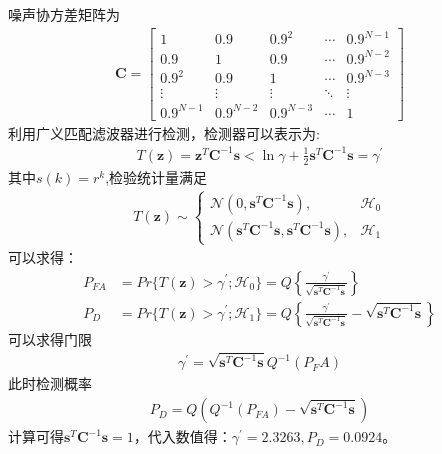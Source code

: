 \documentclass[fontset=windows]{article}
\numberwithin{figure}{section}
\begin{document}
噪声协方差矩阵为
\begin{align*}
    \mathbf{C}=
    \begin{bmatrix}
        1         & 0.9       & 0.9^2     & \cdots & 0.9^{N-1} \\
        0.9       & 1         & 0.9       & \cdots & 0.9^{N-2} \\
        0.9^2     & 0.9       & 1         & \cdots & 0.9^{N-3} \\
        \vdots    & \vdots    & \vdots    & \ddots & \vdots    \\
        0.9^{N-1} & 0.9^{N-2} & 0.9^{N-3} & \cdots & 1
    \end{bmatrix}
\end{align*}
利用广义匹配滤波器进行检测，检测器可以表示为:
\begin{align*}
    T(\mathbf{z})=\mathbf{z}^T\mathbf{C}^{-1}\mathbf{s}<\ln \gamma+\frac{1}{2}\mathbf{s}^T\mathbf{C}^{-1}\mathbf{s}=\gamma^{\prime}
\end{align*}
其中\(s(k)=r^k\),检验统计量满足
\begin{align*}
    T(\mathbf{z})\sim\left\{
    \begin{matrix}
        \mathcal{N}(0,\mathbf{s}^T\mathbf{C}^{-1}\mathbf{s}),                                     & \mathcal{H}_0 \\
        \mathcal{N}(\mathbf{s}^T\mathbf{C}^{-1}\mathbf{s},\mathbf{s}^T\mathbf{C}^{-1}\mathbf{s}), & \mathcal{H}_1
    \end{matrix}
    \right.
\end{align*}
可以求得：
\begin{align*}
    P_{FA} & =Pr\{T(\mathbf{z})>\gamma^{\prime};\mathcal{H}_0\}=Q\left\{\frac{\gamma^{\prime}}{\sqrt{\mathbf{s}^T\mathbf{C}^{-1}\mathbf{s}}}\right\}                                              \\
    P_D    & =Pr\{T(\mathbf{z})>\gamma^{\prime};\mathcal{H}_1\}=Q\left\{\frac{\gamma^{\prime}}{\sqrt{\mathbf{s}^T\mathbf{C}^{-1}\mathbf{s}}}-\sqrt{\mathbf{s}^T\mathbf{C}^{-1}\mathbf{s}}\right\}
\end{align*}
可以求得门限
\begin{align*}
    \gamma^{\prime}=\sqrt{\mathbf{s}^T\mathbf{C}^{-1}\mathbf{s}}Q^{-1}(P_FA)
\end{align*}
此时检测概率
\begin{align*}
    P_D=Q(Q^{-1}(P_{FA})-\sqrt{\mathbf{s}^T\mathbf{C}^{-1}\mathbf{s}})
\end{align*}
计算可得\(\mathbf{s}^T\mathbf{C}^{-1}\mathbf{s}=1\)，代入数值得：\(\gamma^{\prime}=2.3263,P_D=0.0924\)。
\end{document}
